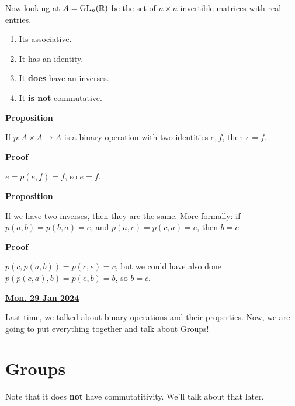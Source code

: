 \documentclass[12pt]{article}
\renewcommand{\date}[1]{\newpage \underline{\bf #1}}
\def\gl{\text{GL}}
\begin{document}
Now looking at $A = \gl_n(\R)$ be the set of $n \times n$ invertible matrices
with real entries.

\begin{enumerate}
	\item Its associative.
	\item It has an identity.
	\item It {\bf does} have an inverses.
	\item It {\bf is not} commutative.
\end{enumerate}

{\bf Proposition}

If $p: A \times A \to A$ is a binary operation with two identities $e, f$,
then $e = f$.

	{\bf Proof}

$e = p(e, f) = f$, so $e = f$.


	{\bf Proposition}

If we have two inverses, then they are the same. More formally: if $p(a, b) =
	p(b, a)= e$, and $p(a, c) = p(c, a) = e$, then $b = c$

{\bf Proof}

$p(c, p(a, b)) = p(c, e) = c$, but we could have also done $p(p(c, a), b) =
	p(e, b) = b$, so $b = c$.

\date{Mon. 29 Jan 2024}


Last time, we talked about binary operations and their properties. Now, we are
going to put everything together and talk about Groups!

\section{Groups}


Note that it does {\bf not} have commutatitivity. We'll talk about that
later.
\end{document}
